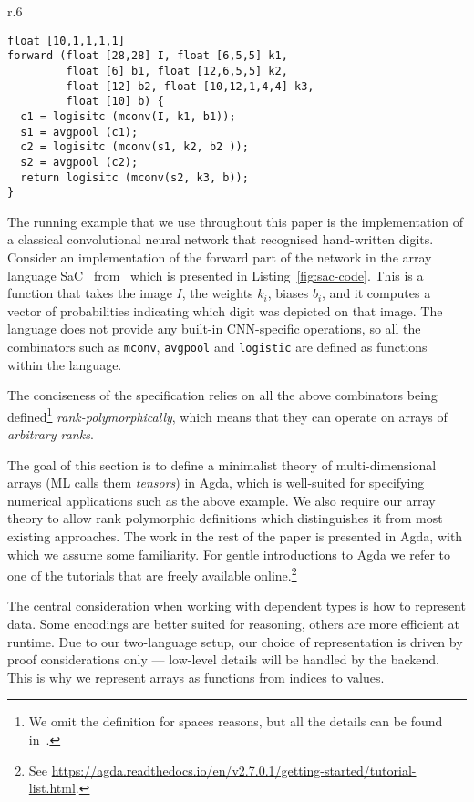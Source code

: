 \begin{wrapfigure}{r}{.6\linewidth}
\begin{lstlisting}[caption=SaC implementation of MNIST from~\cite{cnn-array},%
  label=fig:sac-code]
float [10,1,1,1,1] 
forward (float [28,28] I, float [6,5,5] k1,
         float [6] b1, float [12,6,5,5] k2,
         float [12] b2, float [10,12,1,4,4] k3,
         float [10] b) {
  c1 = logisitc (mconv(I, k1, b1));
  s1 = avgpool (c1);
  c2 = logisitc (mconv(s1, k2, b2 ));
  s2 = avgpool (c2);
  return logisitc (mconv(s2, k3, b));
}
\end{lstlisting}
\end{wrapfigure}
The running example that we use throughout this paper is the implementation of
a classical convolutional neural network that recognised hand-written digits.
Consider an implementation of the forward part of the network in the array 
language SaC~\cite{sac2}
from~\cite{cnn-array} which is presented in Listing~\ref{fig:sac-code}.
This is a function
that takes the image $I$, the weights $k_i$, biases $b_i$, and it computes
a vector of probabilities indicating which digit was depicted on that image.
The language does not provide any built-in CNN-specific operations, so all the
combinators such as \texttt{mconv}, \texttt{avgpool} and \texttt{logistic}
are defined as functions within the language. 

The conciseness of the specification
relies on all the above combinators being defined\footnote{We omit the
definition for spaces reasons, but all the details can be found in~\cite{cnn-array}.}
\emph{rank-polymorphically}, which means that they can operate
on arrays of \emph{arbitrary ranks}.  

The goal of this section is to define a minimalist theory of multi-dimensional
arrays (ML calls them \emph{tensors}) in Agda, which is well-suited for
specifying numerical applications such as the above example.
We also require our array theory to allow rank polymorphic definitions
which distinguishes it from most existing approaches.
The work in the rest of the paper is presented in Agda, with which we assume some
familiarity.
For gentle introductions to Agda we refer to one of the tutorials that are freely available
online.\footnote{See \url{https://agda.readthedocs.io/en/v2.7.0.1/getting-started/tutorial-list.html}.}

The central consideration when working with dependent types is how to represent data.
Some encodings are better suited for reasoning, others are more efficient
at runtime.  Due to our two-language setup, our choice of
representation is driven by proof considerations only --- low-level
details will be handled by the backend.
This is why we represent arrays as functions from indices to values.

